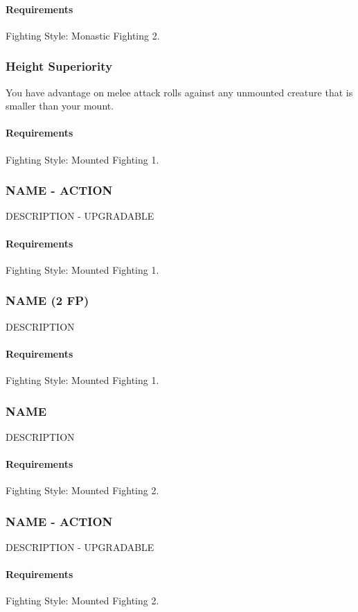     \paragraph{Requirements} Fighting Style: Monastic Fighting 2.
\subsubsection{Height Superiority} \label{feat::heightsuperiority}
    You have advantage on melee attack rolls against any unmounted creature that is smaller than your mount.
    \paragraph{Requirements} Fighting Style: Mounted Fighting 1.
\subsubsection{NAME - ACTION} \label{feat::name}
    DESCRIPTION - UPGRADABLE
    \paragraph{Requirements} Fighting Style: Mounted Fighting 1.
\subsubsection{NAME (2 FP)} \label{feat::name}
    DESCRIPTION
    \paragraph{Requirements} Fighting Style: Mounted Fighting 1.
\subsubsection{NAME} \label{feat::name}
    DESCRIPTION
    \paragraph{Requirements} Fighting Style: Mounted Fighting 2.
\subsubsection{NAME - ACTION} \label{feat::name}
    DESCRIPTION - UPGRADABLE
    \paragraph{Requirements} Fighting Style: Mounted Fighting 2.

